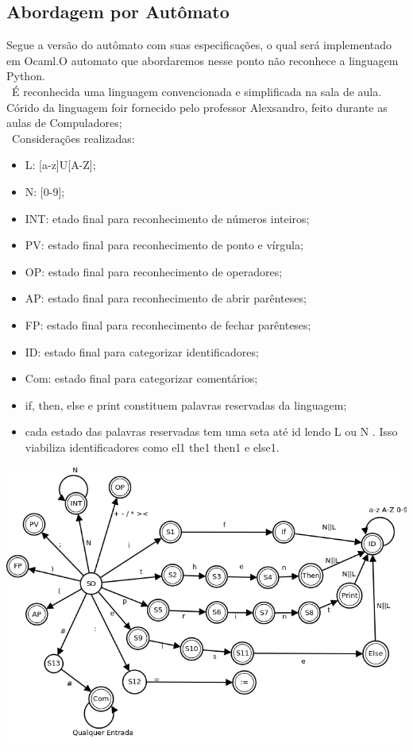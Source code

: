 \documentclass{article}
\begin{document}
\subsection{Abordagem por Autômato}
\label{sec:abordagem}
Segue a versão do autômato com suas especificações, o qual será implementado em Ocaml.O automato que abordaremos nesse ponto não reconhece a linguagem Python.\\\ É reconhecida uma linguagem convencionada e simplificada na sala de aula. Córido da linguagem foir fornecido pelo professor Alexsandro, feito durante as aulas de Compuladores;\\\
Considerações realizadas:\\
\begin{itemize}
\item L: [a-z]U[A-Z];
\item N: [0-9];
\item INT: etado final para reconhecimento de números inteiros;
\item PV: estado final para reconhecimento de ponto e vírgula;
\item OP: estado final para reconhecimento de operadores;
\item AP: estado final para reconhecimento de abrir parênteses;
\item FP: estado final para reconhecimento de fechar parênteses;
\item ID: estado final para categorizar identificadores;
\item Com: estado final para categorizar comentários;
\item if, then, else e print constituem palavras reservadas da linguagem;
\item cada estado das palavras reservadas tem uma seta até id lendo L ou N . Isso viabiliza identificadores como el1 the1 then1 e else1.
\end{itemize}

\begin{center}
\includegraphics[scale=0.55]{AutomatoLexico.png}
\end{center}
\end{document}
